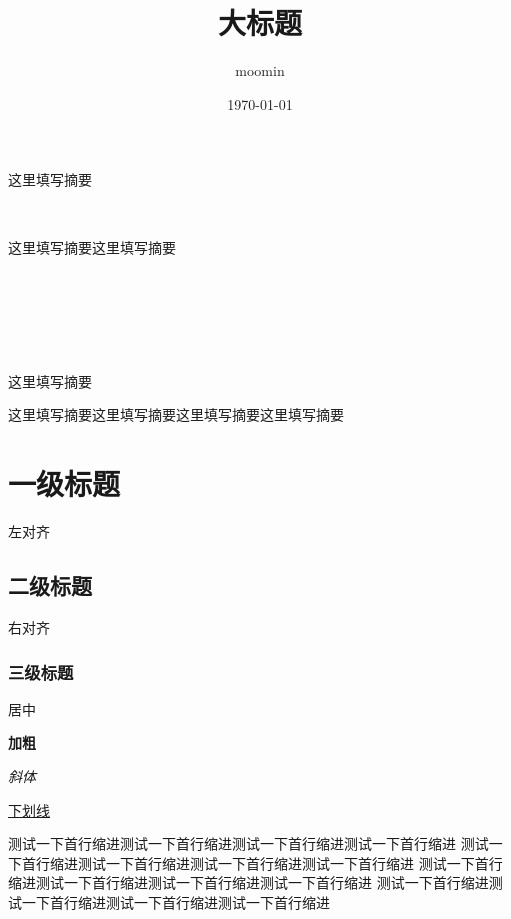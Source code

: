 \documentclass{article}
\title{大标题}
\author{moomin}
\date{\today}
\begin{document}
	\maketitle %

	\tableofcontents

	这里填写摘要

	~ %

	这里填写摘要这里填写摘要

	~

	~

	~

	这里填写摘要

	\vspace{7cm} %

	这里填写摘要这里填写摘要这里填写摘要这里填写摘要

	\newpage

	\section{一级标题}

	\begin{flushleft}
	左对齐
	\end{flushleft}

	\newpage

	\subsection{二级标题}

	\begin{flushright}
	右对齐
	\end{flushright}

	\subsubsection{三级标题}

	\begin{center}
	居中
	\end{center}

	\textbf{加粗}

	\textit{斜体}

	\underline{下划线}

	测试一下首行缩进测试一下首行缩进测试一下首行缩进测试一下首行缩进
	测试一下首行缩进测试一下首行缩进测试一下首行缩进测试一下首行缩进
	测试一下首行缩进测试一下首行缩进测试一下首行缩进测试一下首行缩进
	测试一下首行缩进测试一下首行缩进测试一下首行缩进测试一下首行缩进
\end{document}
